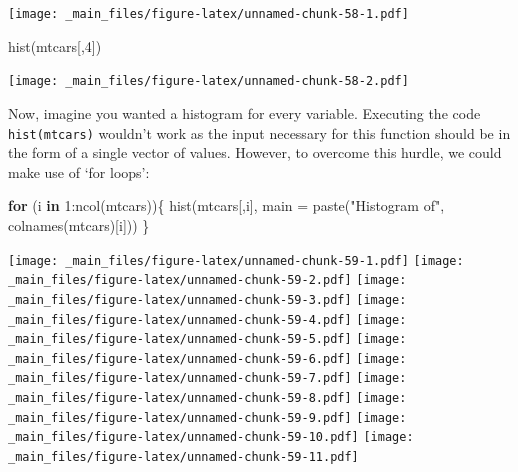 \documentclass[
]{book}
\newenvironment{Shaded}{\begin{snugshade}}{\end{snugshade}}
\newcommand{\AttributeTok}[1]{\textcolor[rgb]{0.77,0.63,0.00}{#1}}
\newcommand{\ControlFlowTok}[1]{\textcolor[rgb]{0.13,0.29,0.53}{\textbf{#1}}}
\newcommand{\DecValTok}[1]{\textcolor[rgb]{0.00,0.00,0.81}{#1}}
\newcommand{\FunctionTok}[1]{\textcolor[rgb]{0.00,0.00,0.00}{#1}}
\newcommand{\NormalTok}[1]{#1}
\newcommand{\SpecialCharTok}[1]{\textcolor[rgb]{0.00,0.00,0.00}{#1}}
\newcommand{\StringTok}[1]{\textcolor[rgb]{0.31,0.60,0.02}{#1}}
\theoremstyle{definition}
\theoremstyle{definition}
\theoremstyle{definition}
\theoremstyle{definition}
\theoremstyle{remark}
\begin{document}
\begin{Shaded}
\end{Shaded}

\texttt{[image: \_main\_files/figure-latex/unnamed-chunk-58-1.pdf]}

\begin{Shaded}
\begin{Highlighting}[]
\FunctionTok{hist}\NormalTok{(mtcars[,}\DecValTok{4}\NormalTok{])}
\end{Highlighting}
\end{Shaded}

\texttt{[image: \_main\_files/figure-latex/unnamed-chunk-58-2.pdf]}

Now, imagine you wanted a histogram for every variable. Executing the code \texttt{hist(mtcars)} wouldn't work as the input necessary for this function should be in the form of a single vector of values. However, to overcome this hurdle, we could make use of `for loops':

\begin{Shaded}
\begin{Highlighting}[]
\ControlFlowTok{for}\NormalTok{ (i }\ControlFlowTok{in} \DecValTok{1}\SpecialCharTok{:}\FunctionTok{ncol}\NormalTok{(mtcars))\{}
  \FunctionTok{hist}\NormalTok{(mtcars[,i], }\AttributeTok{main =} \FunctionTok{paste}\NormalTok{(}\StringTok{"Histogram of"}\NormalTok{, }\FunctionTok{colnames}\NormalTok{(mtcars)[i]))}
\NormalTok{\}}
\end{Highlighting}
\end{Shaded}

\texttt{[image: \_main\_files/figure-latex/unnamed-chunk-59-1.pdf]} \texttt{[image: \_main\_files/figure-latex/unnamed-chunk-59-2.pdf]} \texttt{[image: \_main\_files/figure-latex/unnamed-chunk-59-3.pdf]} \texttt{[image: \_main\_files/figure-latex/unnamed-chunk-59-4.pdf]} \texttt{[image: \_main\_files/figure-latex/unnamed-chunk-59-5.pdf]} \texttt{[image: \_main\_files/figure-latex/unnamed-chunk-59-6.pdf]} \texttt{[image: \_main\_files/figure-latex/unnamed-chunk-59-7.pdf]} \texttt{[image: \_main\_files/figure-latex/unnamed-chunk-59-8.pdf]} \texttt{[image: \_main\_files/figure-latex/unnamed-chunk-59-9.pdf]} \texttt{[image: \_main\_files/figure-latex/unnamed-chunk-59-10.pdf]} \texttt{[image: \_main\_files/figure-latex/unnamed-chunk-59-11.pdf]}
\end{document}
